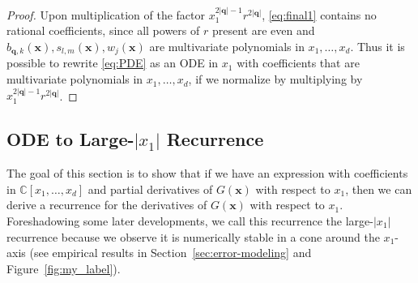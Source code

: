 \documentclass[12pt]{article}
\def\C{{\mathbb C}}
\let\b=\boldsymbol
\theoremstyle{definition}
\theoremstyle{plain}
\theoremstyle{definition}
\begin{document}
\begin{proof}
Upon multiplication of the factor $x_1^{2|\b{q}|-1} r^{2|\b{q}|}$, \eqref{eq:final1} contains no rational coefficients, since all powers of $r$ present are even and $b_{\b{q},k}(\b{x}), s_{l,m} (\b{x}), w_{j}(\b{x})$ are multivariate polynomials in $x_1, \dots, x_d$. Thus it is possible to rewrite \eqref{eq:PDE} as an ODE in $x_1$ with coefficients that are multivariate polynomials in $x_1, \dots, x_d$, if we normalize by multiplying by $x_1^{2|\b{q}|-1} r^{2|\b{q}|} $.
\end{proof}





\subsection{ODE to Large-$|x_1|$ Recurrence}
\label{sec:large-x1}



The goal of this section is to show that if we have an expression with coefficients in $\C[x_1, \dots, x_d]$ and partial derivatives of $G(\b{x})$ with respect to $x_1$, then we can derive a recurrence for the derivatives of $G(\b{x})$ with respect to $x_1$. Foreshadowing some later developments, we call this recurrence the large-$|x_1|$ recurrence because we observe it is numerically stable in a cone around the $x_1$-axis (see empirical results in Section~\ref{sec:error-modeling} and Figure~\ref{fig:my_label}).
\end{document}
